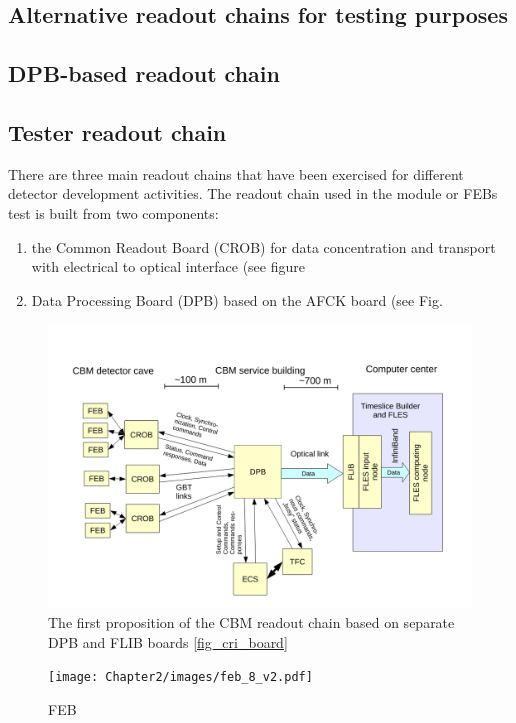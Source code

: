 \subsection{Alternative readout chains for testing purposes}

\subsection{DPB-based readout chain}

\subsection{Tester readout chain}

There are three main readout chains that have been exercised for different detector development activities.  
The readout chain used in the module or FEBs test is built from two components: 
\begin{enumerate}
    \item the Common Readout Board (\gls{CROB}) for data concentration and transport with electrical to optical interface (see figure 
    \item Data Processing Board (DPB) based on the AFCK board (see Fig.
\end{enumerate}

\begin{figure}[!h]
\centering
\includegraphics[width=0.75\columnwidth]{Chapter2/images/DPB.png}
\caption{The first proposition of the CBM readout chain based on separate DPB and FLIB boards \ref{fig_cri_board}}
\label{fig_dpb_scheme}
\end{figure}

\begin{figure}[!h]
\centering
\texttt{[image: Chapter2/images/feb\_8\_v2.pdf]}
\caption{FEB}
\label{fig_febA_photo}
\end{figure}
